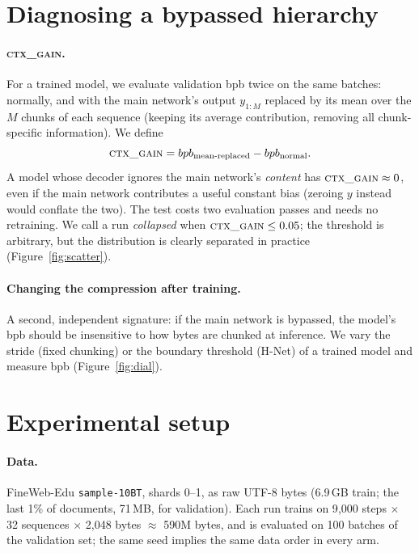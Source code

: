 \documentclass[10pt]{article}
\newcommand{\ctx}{\textsc{ctx\_gain}}
\newcommand{\bpb}{bpb}
\begin{document}
\section{Diagnosing a bypassed hierarchy}
\label{sec:diag}

\paragraph{\ctx{}.} For a trained model, we evaluate validation \bpb{} twice on the same
batches: normally, and with the main network's output $y_{1:M}$ replaced by its mean over the
$M$ chunks of each sequence (keeping its average contribution, removing all chunk-specific
information). We define
\[
\ctx{} = \bpb_{\text{mean-replaced}} - \bpb_{\text{normal}} .
\]
A model whose decoder ignores the main network's \emph{content} has $\ctx{}\approx 0$, even if
the main network contributes a useful constant bias (zeroing $y$ instead would conflate the two).
The test costs two evaluation passes and needs no retraining. We call a run \emph{collapsed}
when $\ctx{}\le 0.05$; the threshold is arbitrary, but the distribution is clearly separated
in practice (Figure~\ref{fig:scatter}).

\paragraph{Changing the compression after training.} A second, independent signature: if the
main network is bypassed, the model's \bpb{} should be insensitive to how bytes are chunked at
inference. We vary the stride (fixed chunking) or the boundary threshold (H-Net) of a trained
model and measure \bpb{} (Figure~\ref{fig:dial}).

\section{Experimental setup}
\label{sec:setup}

\paragraph{Data.} FineWeb-Edu \citep{penedo2024fineweb} \texttt{sample-10BT}, shards 0--1, as raw
UTF-8 bytes (6.9\,GB train; the last 1\% of documents, 71\,MB, for validation). Each run trains on
9{,}000 steps $\times$ 32 sequences $\times$ 2{,}048 bytes $\approx$ 590M bytes, and is evaluated
on 100 batches of the validation set; the same seed implies the same data order in every arm.
\end{document}
